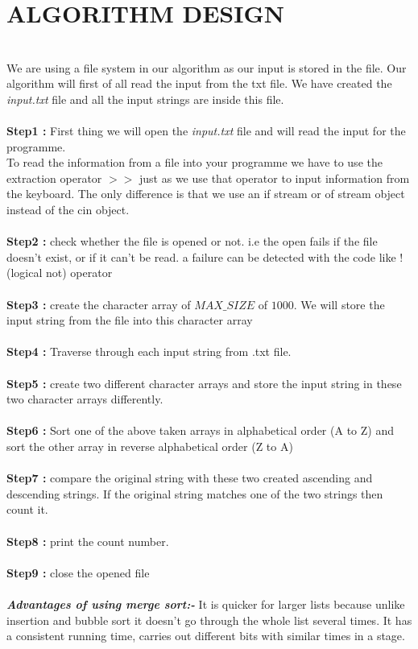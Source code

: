 \documentclass[conference]{IEEEtran}
\begin{document}
\section{ALGORITHM DESIGN}\\
We are using a file system in our algorithm as 
our input is stored in the file. Our algorithm 
will first of all read the input from the txt file. We have created the \textit{input.txt} file and all the input strings are inside this file.\\
\\\textbf{Step1 :}
First thing we will open the \textit{input.txt} file and will read the input for the programme. 
\\To read the information from a file into your 
programme we have to use the extraction 
operator $>>$  just as we use that operator to 
input information from the keyboard. The only 
difference is that we use an if stream or of stream object instead of the cin object. 
\\\\\textbf{Step2 :}
check whether the file is opened or 
not. i.e the open fails if the file doesn't exist, or if it can't be read. a failure can be detected with the code like !(logical not) operator 
\\\\\textbf{Step3 :}
create the character array of $MAX\_SIZE$ of $1000$. We will store the input string from the file into this character array
\\\\\textbf{Step4 :}
Traverse through each input string 
from .txt file.
\\\\\textbf{Step5 :}
create two different character arrays 
and store the input string in these two character 
arrays differently. 
\\\\\textbf{Step6 :}
Sort one of the above taken arrays in 
alphabetical order (A to Z) and sort the other 
array in reverse alphabetical order (Z to A)
\\\\\textbf{Step7 :}
compare the original string with these 
two created ascending and descending strings. 
If the original string matches one of the two 
strings then count it. 
\\\\\textbf{Step8 :}
print the count number.
\\\\\textbf{Step9 :}
close the opened file 
\\\\\textbf{\textit{Advantages of using merge sort:- }}
 It is quicker for larger lists because unlike 
insertion and bubble sort it doesn't go through the 
whole list several times. 
It has a consistent running time, carries out 
different bits with similar  times in a stage. 
\end{document}
